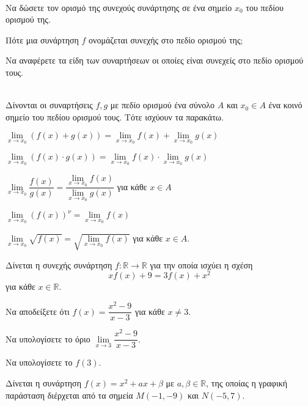 \documentclass[ektypwsh]{frontisthrio-diag}
\begin{document}
\begin{thema}
\item\mbox{}\\\vspace{-7mm}
\begin{erwthma}
\item Να δώσετε τον ορισμό της συνεχούς συνάρτησης σε ένα σημείο $ x_0 $ του πεδίου ορισμού της.
\item Πότε μια συνάρτηση $ f $ ονομάζεται συνεχής στο πεδίο ορισμού της;
\item Να αναφέρετε τα είδη των συναρτήσεων οι οποίες είναι συνεχείς στο πεδίο ορισμού τους.
\item \swstolathospan\\
Δίνονται οι συναρτήσεις $ f,g $ με πεδίο ορισμού ένα σύνολο $ A $ και $ x_0\in A $ ένα κοινό σημείο του πεδίου ορισμού τους. Τότε ισχύουν τα παρακάτω.
\begin{alist}
\item $ \lim\limits_{x\to x_0}{(f(x)+g(x))}=\lim\limits_{x\to x_0}{f(x)}+\lim\limits_{x\to x_0}{g(x)} $
\item $ \lim\limits_{x\to x_0}{(f(x)\cdot g(x))}=\lim\limits_{x\to x_0}{f(x)}\cdot\lim\limits_{x\to x_0}{g(x)} $
\item $ \lim\limits_{x\to x_0}{\dfrac{f(x)}{g(x)}}=\dfrac{\lim\limits_{x\to x_0}{f(x)}}{\lim\limits_{x\to x_0}{g(x)}} $ για κάθε $ x\in A $
\item $ \lim\limits_{x\to x_0}{(f(x))^{\nu}}=\lim\limits_{x\to x_0}{f(x)} $
\item $ \lim\limits_{x\to x_0}{\sqrt{f(x)}}=\sqrt{\lim\limits_{x\to x_0}{f(x)}} $ για κάθε $ x\in A $.
\end{alist}
\end{erwthma}
\item Δίνεται η συνεχής συνάρτηση $ f:\mathbb{R}\to \mathbb{R} $ για την οποία ισχύει η σχέση
\[ xf(x)+9=3f(x)+x^2 \]
για κάθε $ x\in\mathbb{R} $.
\begin{erwthma}
\item Να αποδείξετε ότι $ f(x)=\dfrac{x^2-9}{x-3} $ για κάθε $ x\neq 3 $.
\item Να υπολογίσετε το όριο $ \lim\limits_{x\to 3}\dfrac{x^2-9}{x-3} $.
\item Να υπολογίσετε το $ f(3) $.
\end{erwthma}
\item Δίνεται η συνάρτηση $ f(x)=x^2+ax+\beta $ με $ a,\beta\in\mathbb{R} $, της οποίας η γραφική παράσταση διέρχεται από τα σημεία $ M(-1,-9) $ και $ N(-5,7) $.

\end{thema}
\end{document}

